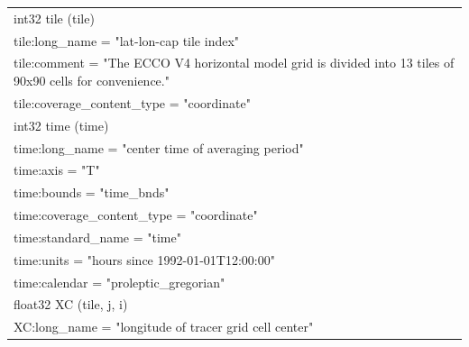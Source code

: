\begin{longtable}{|p{\textwidth}|}
\rowcolor{Apricot}\hspace{0.5cm}int32 tile (tile)\\
\rowcolor{Apricot}\hspace{0.5cm}\hspace{0.5cm}tile:long\_name = "lat-lon-cap tile index"\\
\rowcolor{Apricot}\hspace{0.5cm}\hspace{0.5cm}tile:comment = "The ECCO V4 horizontal model grid is divided into 13 tiles of 90x90 cells for convenience."\\
\rowcolor{Apricot}\hspace{0.5cm}\hspace{0.5cm}tile:coverage\_content\_type = "coordinate"\\
\rowcolor{Apricot}\hspace{0.5cm}int32 time (time)\\
\rowcolor{Apricot}\hspace{0.5cm}\hspace{0.5cm}time:long\_name = "center time of averaging period"\\
\rowcolor{Apricot}\hspace{0.5cm}\hspace{0.5cm}time:axis = "T"\\
\rowcolor{Apricot}\hspace{0.5cm}\hspace{0.5cm}time:bounds = "time\_bnds"\\
\rowcolor{Apricot}\hspace{0.5cm}\hspace{0.5cm}time:coverage\_content\_type = "coordinate"\\
\rowcolor{Apricot}\hspace{0.5cm}\hspace{0.5cm}time:standard\_name = "time"\\
\rowcolor{Apricot}\hspace{0.5cm}\hspace{0.5cm}time:units = "hours since 1992-01-01T12:00:00"\\
\rowcolor{Apricot}\hspace{0.5cm}\hspace{0.5cm}time:calendar = "proleptic\_gregorian"\\
\rowcolor{Apricot}\hspace{0.5cm}float32 XC (tile, j, i)\\
\rowcolor{Apricot}\hspace{0.5cm}\hspace{0.5cm}XC:long\_name = "longitude of tracer grid cell center"\\

\end{longtable}
